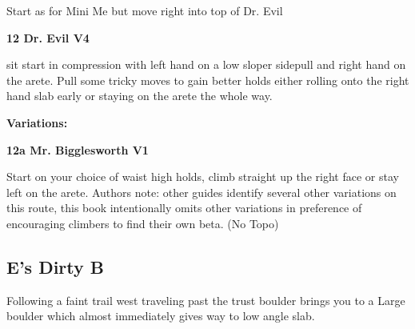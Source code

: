 \begin{multicols}{2}
\begin{minipage}{\linewidth}
					\begin{adjustwidth}{0.5cm}{}				
					Start as for Mini Me but move right into top of Dr. Evil
					\end{adjustwidth}
					\end{minipage}

					\begin{minipage}{\linewidth}	
					\label{rt:Dr. Evil}
\colorbox{RoyalBlue!20}{
\textbf{
12 Dr. Evil V4    
}
}

					\begin{adjustwidth}{0.5cm}{}				
					sit start in compression with left hand on a low sloper sidepull and right hand on the arete. Pull some tricky moves to gain better holds either rolling onto the right hand slab early or staying on the arete the whole way.
					\end{adjustwidth}
					\end{minipage}
						\begin{adjustwidth}{0.5cm}{}				
						\textbf{Variations:} \newline
							\begin{minipage}{\linewidth}	
							\label{vr:Mr. Bigglesworth}
\colorbox{green!20}{
\textbf{
12a Mr. Bigglesworth V1    
}
}

							\begin{adjustwidth}{0.5cm}{}				
							Start on your choice of waist high holds, climb straight up the right face or stay left on the arete. Authors note: other guides identify several other variations on this route, this book intentionally omits other variations in preference of encouraging climbers to find their own beta.
								\newline (No Topo) 
							\end{adjustwidth}
							\end{minipage}
						\end{adjustwidth}
			\subsection*{E's Dirty B}\label{bf:E's Dirty B}
			\begin{minipage}{\columnwidth}
			Following a faint trail west traveling past the trust boulder brings you to a Large boulder which almost immediately gives way to low angle slab.
			\end{minipage}
			


\end{multicols}
